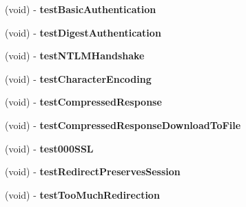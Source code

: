 \begin{DoxyCompactItemize}
\item 
\hypertarget{interface_a_s_i_h_t_t_p_request_tests_a95ec0edfa8e276c8e701b57e76d20c03}{
(void) -\/ {\bfseries test\-Basic\-Authentication}}
\label{interface_a_s_i_h_t_t_p_request_tests_a95ec0edfa8e276c8e701b57e76d20c03}

\item 
\hypertarget{interface_a_s_i_h_t_t_p_request_tests_a66b1d1d52e3faaadb334efa3ca93351e}{
(void) -\/ {\bfseries test\-Digest\-Authentication}}
\label{interface_a_s_i_h_t_t_p_request_tests_a66b1d1d52e3faaadb334efa3ca93351e}

\item 
\hypertarget{interface_a_s_i_h_t_t_p_request_tests_a42b76a1c974d5b1b8ff1a22a20381b06}{
(void) -\/ {\bfseries test\-N\-T\-L\-M\-Handshake}}
\label{interface_a_s_i_h_t_t_p_request_tests_a42b76a1c974d5b1b8ff1a22a20381b06}

\item 
\hypertarget{interface_a_s_i_h_t_t_p_request_tests_ae25e5af72786306a726678b3e50efa71}{
(void) -\/ {\bfseries test\-Character\-Encoding}}
\label{interface_a_s_i_h_t_t_p_request_tests_ae25e5af72786306a726678b3e50efa71}

\item 
\hypertarget{interface_a_s_i_h_t_t_p_request_tests_ae884e3724fa16e86e2c9f202fafb0832}{
(void) -\/ {\bfseries test\-Compressed\-Response}}
\label{interface_a_s_i_h_t_t_p_request_tests_ae884e3724fa16e86e2c9f202fafb0832}

\item 
\hypertarget{interface_a_s_i_h_t_t_p_request_tests_ad9fe5125c3c071c35369d0df17222250}{
(void) -\/ {\bfseries test\-Compressed\-Response\-Download\-To\-File}}
\label{interface_a_s_i_h_t_t_p_request_tests_ad9fe5125c3c071c35369d0df17222250}

\item 
\hypertarget{interface_a_s_i_h_t_t_p_request_tests_a91af84b41f3a46f64d16095adb340214}{
(void) -\/ {\bfseries test000\-S\-S\-L}}
\label{interface_a_s_i_h_t_t_p_request_tests_a91af84b41f3a46f64d16095adb340214}

\item 
\hypertarget{interface_a_s_i_h_t_t_p_request_tests_a3132c64a767dc4789eedb611544874b7}{
(void) -\/ {\bfseries test\-Redirect\-Preserves\-Session}}
\label{interface_a_s_i_h_t_t_p_request_tests_a3132c64a767dc4789eedb611544874b7}

\item 
\hypertarget{interface_a_s_i_h_t_t_p_request_tests_abdde777c6d2c53c38bbbd414f01ab11c}{
(void) -\/ {\bfseries test\-Too\-Much\-Redirection}}
\label{interface_a_s_i_h_t_t_p_request_tests_abdde777c6d2c53c38bbbd414f01ab11c}


\end{DoxyCompactItemize}
